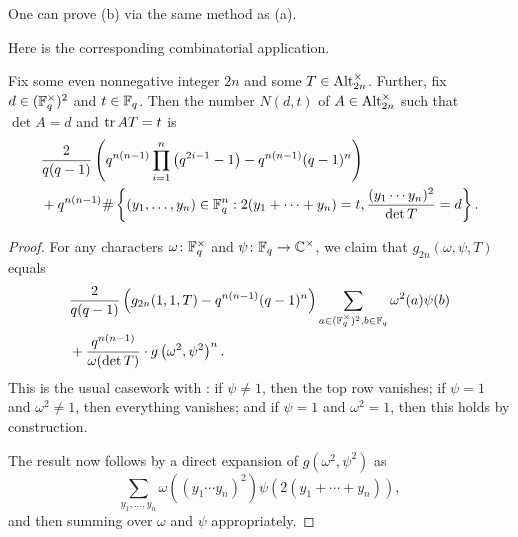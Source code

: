 \begin{remark}
    One can prove (b) via the same method as (a).
\end{remark}
Here is the corresponding combinatorial application.
\begin{corollary} \label{cor:count-alt}
    Fix some even nonnegative integer $2n$ and some $T\in\operatorname{Alt}_{2n}^\times$. Further, fix $d\in(\mathbb F_q^{\times})^2$ and $t\in\mathbb F_q$. Then the number $N(d,t)$ of $A\in\operatorname{Alt}_{2n}^\times$ such that $\det A=d$ and $\operatorname{tr} AT=t$ is
    \begin{align*}
        &\frac2{q(q-1)}\left(q^{n(n-1)}\prod_{i=1}^{n}\left(q^{2i-1}-1\right)-q^{n(n-1)}(q-1)^n\right) \\
        &+ q^{n(n-1)}\#\left\{(y_1,\ldots,y_n)\in\mathbb F_q^n:2(y_1+\cdots+y_n)=t,\frac{(y_1\cdots y_n)^2}{\det T}=d\right\}.
    \end{align*}
\end{corollary}
\begin{proof}
    For any characters $\omega\colon\mathbb F_q^\times$ and $\psi\colon\mathbb F_q\to\mathbb C^\times$, we claim that $g_{2n}(\omega,\psi,T)$ equals
    \begin{align*}
        &\frac 2{q(q-1)}
        \left(g_{2n}(1,1,T)-q^{n(n-1)}(q-1)^n\right)\sum_{a\in(\mathbb F_q^{\times})^2,b\in\mathbb F_q}\omega^2(a)\psi(b) \\
        &+\frac{q^{n(n-1)}}{\omega(\det T)}\cdot g\left(\omega^2,\psi^2\right)^n.
    \end{align*}
    This is the usual casework with : if $\psi\ne1$, then the top row vanishes; if $\psi=1$ and $\omega^2\ne1$, then everything vanishes; and if $\psi=1$ and $\omega^2=1$, then this holds by construction.

    The result now follows by a direct expansion of $g\left(\omega^2,\psi^2\right)$
    as
    \[\sum_{y_1,\ldots,y_n}\omega\left((y_1\cdots y_n)^2\right)\psi(2(y_1+\cdots+y_n)),\]
    and then summing over $\omega$ and $\psi$ appropriately.
\end{proof}



